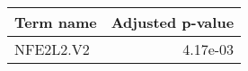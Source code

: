 \begin{tabular}{lr}
\toprule
Term name &  Adjusted p-value \\
\midrule
NFE2L2.V2 &          4.17e-03 \\
\bottomrule
\end{tabular}

